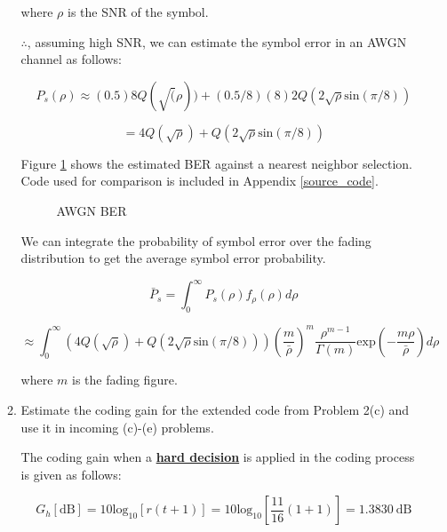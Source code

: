 \documentclass[fleqn]{article}
\begin{document}
\begin{enumerate}
\begin{enumerate}
			where $\rho$ is the SNR of the symbol.
			
			$\therefore$, assuming high SNR, we can estimate the symbol error in an AWGN channel as follows:
			
			\begin{equation*}
				P_s(\rho) \approx (0.5)8Q(\sqrt(\rho)) + (0.5/8)(8)2Q(2\sqrt{\rho}\text{sin}(\pi/8))
			\end{equation*}
			
			\begin{equation*}
				= 4Q(\sqrt{\rho}) + Q(2\sqrt{\rho}\text{sin}(\pi/8))
			\end{equation*}
			
			Figure \ref{fig::ber} shows the estimated BER against a nearest neighbor selection. Code used for comparison is included in Appendix \ref{source_code}.
			  
			\begin{figure}[H]
				\centerline{}
				\caption{AWGN BER}
				\label{fig::ber}
			\end{figure}
		
			We can integrate the probability of symbol error over the fading distribution to get the average symbol error probability.
			
			\begin{equation*}
				\bar{P}_s = \int_{0}^{\infty}{P_s(\rho)f_{\rho}(\rho)d\rho}
			\end{equation*}
			
			\begin{equation*}
				\approx \int_{0}^{\infty}{(4Q(\sqrt{\rho}) + Q(2\sqrt{\rho}\text{sin}(\pi/8)))\left(\frac{m}{\bar{\rho}}\right)^m\frac{\rho^{m-1}}{\Gamma(m)}\text{exp}\left(-\frac{m\rho}{\bar{\rho}}\right)d\rho}
			\end{equation*}
			
			where $m$ is the fading figure.
			
			\item Estimate the coding gain for the extended code from Problem 2(c) and use it in incoming (c)-(e) problems.
			
			The coding gain when a \textbf{\underline{hard decision}} is applied in the coding process is given as follows:
			
			\begin{equation*}
				G_h[\text{dB}] = 10\text{log}_{10}[r(t+1)] = 10\text{log}_{10}\left[\frac{11}{16}(1+1)\right] = 1.3830 \ \text{dB}
			\end{equation*}
				

\end{enumerate}
\end{enumerate}
\end{document}
